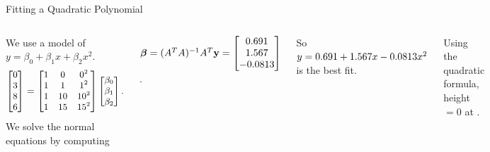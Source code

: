 \documentclass[xcolor=dvipsnames,aspectratio=169,t]{beamer}
\begin{document}
\begin{frame}{Fitting a Quadratic Polynomial}
\begin{columns}[T]
  \medskip
  
  {\small
  \pause
  We use a model of $y=\beta_0 + \beta_1 x + \beta_2 x^2$.
  \[
    \small
    \begin{bmatrix} 0 \\ 3 \\ 8 \\ 6 \end{bmatrix}
    =
    \begin{bmatrix}
      1 & 0 & 0^2 \\
      1 & 1 & 1^2 \\
      1 & 10 & 10^2 \\
      1 & 15 & 15^2
    \end{bmatrix}
    \begin{bmatrix} \beta_0 \\ \beta_1 \\ \beta_2 \end{bmatrix}.
  \]
  \pause
  We solve the \alert{normal equations} by computing
  
  \hspace*{3em} $\boldsymbol\beta =(A^T A)^{-1} A^T \mathbf{y} = 
    \begin{bmatrix} 0.691 \\ 1.567 \\ -0.0813 \end{bmatrix}$.
  \smallskip
  
  So ${\footnotesize y=0.691 + 1.567x -0.0813x^2}$ is the \alert{best fit}.
  \bigskip
  
  \pause
  Using the quadratic formula, height $=0$ at .
  }
  \end{columns}
  
  
\end{frame}
\end{document}
